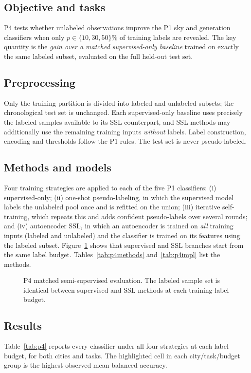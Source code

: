 \documentclass[11pt,letterpaper]{article}
\newcommand{\tikzfit}[1]{\resizebox{\textwidth}{!}{}}
\begin{document}
\subsection{Objective and tasks}
P4 tests whether unlabeled observations improve the P1 sky and generation classifiers when only
$p\in\{10,30,50\}\%$ of training labels are revealed. The key quantity is the \emph{gain over a
matched supervised-only baseline} trained on exactly the same labeled subset, evaluated on the full
held-out test set.

\subsection{Preprocessing}
Only the training partition is divided into labeled and unlabeled subsets; the chronological test
set is unchanged. Each supervised-only baseline uses precisely the labeled samples available to
its SSL counterpart, and SSL methods may additionally use the remaining training inputs
\emph{without} labels. Label construction, encoding and thresholds follow the P1 rules. The test set
is never pseudo-labeled.

\subsection{Methods and models}
Four training strategies are applied to each of the five P1 classifiers: (i) supervised-only;
(ii) one-shot pseudo-labeling, in which the supervised model labels the unlabeled pool once and is
refitted on the union; (iii) iterative self-training, which repeats this and adds confident
pseudo-labels over several rounds; and (iv) autoencoder SSL, in which an autoencoder is trained on
\emph{all} training inputs (labeled and unlabeled) and the classifier is trained on its features
using the labeled subset. Figure~\ref{fig:p4flow} shows that supervised and SSL branches start from
the same label budget. Tables~\ref{tab:p4methods} and~\ref{tab:p4impl} list the methods.



\begin{figure}[!htbp]\centering
\tikzfit{p4_ssl}
\caption{P4 matched semi-supervised evaluation. The labeled sample set is identical between supervised and SSL methods at each training-label budget.}\label{fig:p4flow}
\end{figure}

\subsection{Results}
Table~\ref{tab:p4} reports every classifier under all four strategies at each label budget, for
both cities and tasks. The highlighted cell in each city/task/budget group is the highest observed
mean balanced accuracy.
\end{document}
